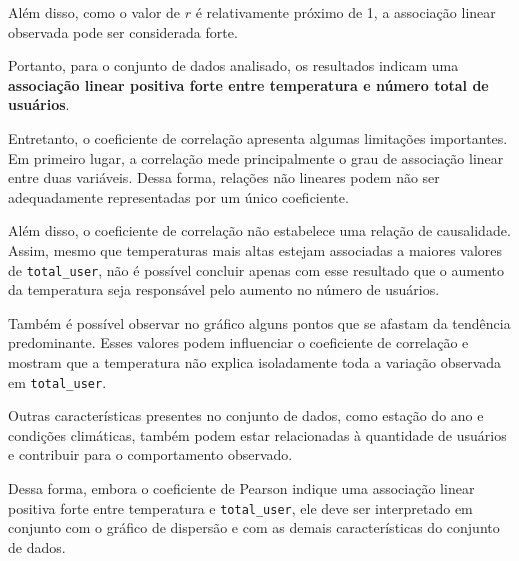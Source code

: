 \documentclass[12pt,a4paper]{article}
\begin{document}
Além disso, como o valor de $r$ é relativamente próximo de 1, a associação linear observada pode ser considerada forte.

Portanto, para o conjunto de dados analisado, os resultados indicam uma \textbf{associação linear positiva forte entre temperatura e número total de usuários}.

Entretanto, o coeficiente de correlação apresenta algumas limitações importantes. Em primeiro lugar, a correlação mede principalmente o grau de associação linear entre duas variáveis. Dessa forma, relações não lineares podem não ser adequadamente representadas por um único coeficiente.

Além disso, o coeficiente de correlação não estabelece uma relação de causalidade. Assim, mesmo que temperaturas mais altas estejam associadas a maiores valores de \texttt{total\_user}, não é possível concluir apenas com esse resultado que o aumento da temperatura seja responsável pelo aumento no número de usuários.

Também é possível observar no gráfico alguns pontos que se afastam da tendência predominante. Esses valores podem influenciar o coeficiente de correlação e mostram que a temperatura não explica isoladamente toda a variação observada em \texttt{total\_user}.

Outras características presentes no conjunto de dados, como estação do ano e condições climáticas, também podem estar relacionadas à quantidade de usuários e contribuir para o comportamento observado.

Dessa forma, embora o coeficiente de Pearson indique uma associação linear positiva forte entre temperatura e \texttt{total\_user}, ele deve ser interpretado em conjunto com o gráfico de dispersão e com as demais características do conjunto de dados.
\end{document}
